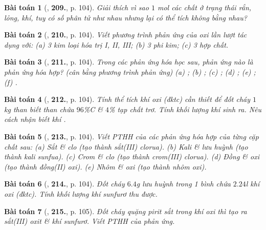 \documentclass{article}
\numberwithin{equation}{section}
\newtheorem{baitoan}{Bài toán}
\begin{document}
\begin{baitoan}[\cite{An_400_BT_Hoa_Hoc_8_2020}, \textbf{209.}, p. 104]
	Giải thích vì sao $1$ \emph{mol} các chất ở trạng thái rắn, lỏng, khí, tuy có số phân tử như nhau nhưng lại có thể tích không bằng nhau?
\end{baitoan}

\begin{baitoan}[\cite{An_400_BT_Hoa_Hoc_8_2020}, \textbf{210.}, p. 104]
	Viết phương trình phản ứng của oxi lần lượt tác dụng với: (a) 3 kim loại hóa trị I, II, III; (b) 3 phi kim; (c) 3 hợp chất.
\end{baitoan}

\begin{baitoan}[\cite{An_400_BT_Hoa_Hoc_8_2020}, \textbf{211.}, p. 104]
	Trong các phản ứng hóa học sau, phản ứng nào là phản ứng hóa hợp? (cân bằng phương trình phản ứng) (a) \emph{}; (b) \emph{}; (c) \emph{}; (d) \emph{}; (e) \emph{}; (f) \emph{}.
\end{baitoan}

\begin{baitoan}[\cite{An_400_BT_Hoa_Hoc_8_2020}, \textbf{212.}, p. 104]
	Tính thể tích khí oxi (đktc) cần thiết để đốt cháy $1$\emph{kg} than biết than chứa $96$\%\emph{C} \& $4$\% tạp chất trơ. Tính khối lượng khí \emph{} sinh ra. Nêu cách nhận biết khí \emph{}.
\end{baitoan}

\begin{baitoan}[\cite{An_400_BT_Hoa_Hoc_8_2020}, \textbf{213.}, p. 104]
	Viết PTHH của các phản ứng hóa hợp của từng cặp chất sau: (a) Sắt \& clo (tạo thành sắt(III) clorua). (b) Kali \& lưu huỳnh (tạo thành kali sunfua). (c) Crom \& clo (tạo thành crom(III) clorua). (d) Đồng \& oxi (tạo thành đồng(II) oxi). (e) Nhôm \& oxi (tạo thành nhôm oxi).
\end{baitoan}

\begin{baitoan}[\cite{An_400_BT_Hoa_Hoc_8_2020}, \textbf{214.}, p. 104]
	Đốt cháy $6.4$\emph{g} lưu huỳnh trong 1 bình chứa $2.24$\emph{l} khí oxi (đktc). Tính khối lượng khí sunfurơ \emph{} thu được.
\end{baitoan}

\begin{baitoan}[\cite{An_400_BT_Hoa_Hoc_8_2020}, \textbf{215.}, p. 105]
	Đốt cháy quặng pirit sắt \emph{} trong khí oxi thì tạo ra sắt(III) oxit \& khí sunfurơ. Viết PTHH của phản ứng.
\end{baitoan}
\end{document}
